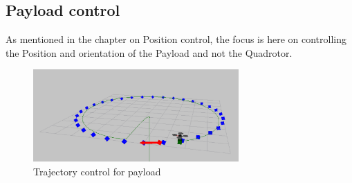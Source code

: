 \documentclass[hidelinks,BTech]{iitmdiss}
\begin{document}
\subsection*{Payload control}
As mentioned in the chapter on Position control, the focus is here on controlling the Position and orientation of the Payload and not the Quadrotor. 

\begin{figure}[H]
  \centering
    \includegraphics[width=0.7\textwidth]{Pure_Pursuit_payload.png}
    \caption{Trajectory control for payload}
\end{figure}
\end{document}
